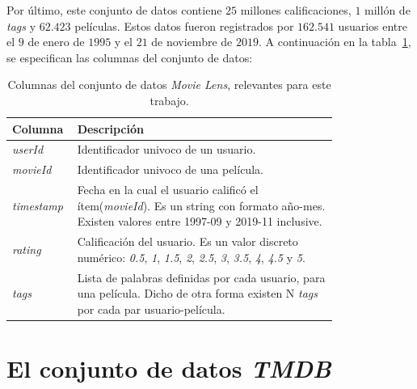 \documentclass[11pt,a4paper,twoside]{thesis}
\begin{document}
Por último, este conjunto de datos contiene $25$ millones calificaciones, $1$
millón de \textit{tags} y $62.423$ películas. Estos datos fueron registrados
por $162.541$ usuarios entre el $9$ de enero de $1995$ y el $21$ de noviembre
de $2019$. A continuación en la tabla~\ref{table:movieLensColumns}, se
especifican las columnas del conjunto de datos:

\begin{table}[!htb]
	\centering
	\footnotesize
	\begin{tabular}{l | p{0.8\linewidth}}
		\hline
		Columna            & Descripción                                                                                                                                                                                 \\
		\hline
		\textit{userId}    & Identificador univoco de un usuario.                                                                                                                                                        \\
		\textit{movieId}   & Identificador univoco de una película.                                                                                                                                                      \\
		\textit{timestamp} & Fecha en la cual el usuario calificó el ítem(\textit{movieId}). Es un string con formato año-mes. Existen valores entre 1997-09 y 2019-11 inclusive.                                        \\
		\textit{rating}    & Calificación del usuario. Es un valor discreto numérico: \textit{0.5}, \textit{1}, \textit{1.5}, \textit{2}, \textit{2.5}, \textit{3}, \textit{3.5}, \textit{4}, \textit{4.5} y \textit{5}. \\
		\textit{tags}      & Lista de palabras definidas por cada usuario, para una película. Dicho de otra forma existen N \textit{tags} por cada par usuario-película.                                                 \\
		\hline
	\end{tabular}
	\caption{
		Columnas del conjunto de datos \textit{Movie Lens}, relevantes para este trabajo.
	}
	\label{table:movieLensColumns}
\end{table}

\clearpage

\section{El conjunto de datos \textit{TMDB}}
\end{document}
